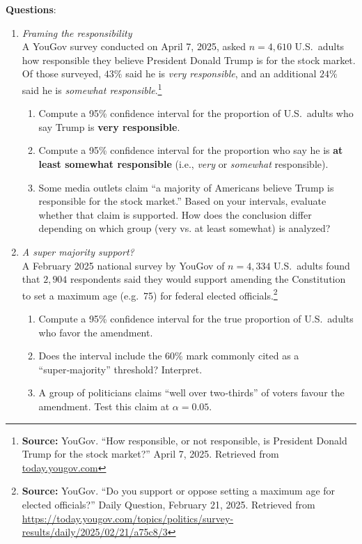 \documentclass{article}
\begin{document}
\textbf{Questions}:
\begin{enumerate}
\item  \emph{Framing the responsibility} \\
      A YouGov survey conducted on April 7, 2025, asked $n = 4{,}610$ U.S.\ adults how responsible they believe President Donald Trump is for the stock market. Of those surveyed, $43\%$ said he is \emph{very responsible}, and an additional $24\%$ said he is \emph{somewhat responsible}.\footnote{\textbf{Source:} YouGov. “How responsible, or not responsible, is President Donald Trump for the stock market?” April 7, 2025. Retrieved from \href{https://today.yougov.com/topics/politics/survey-results/daily/2025/04/07/6be5c/3}{today.yougov.com}}
      \begin{enumerate}[label=(\alph*)]
         \item Compute a 95\% confidence interval for the proportion of U.S.\ adults who say Trump is \textbf{very responsible}.
         \item Compute a 95\% confidence interval for the proportion who say he is \textbf{at least somewhat responsible} (i.e., \emph{very} or \emph{somewhat} responsible).
         \item Some media outlets claim “a majority of Americans believe Trump is responsible for the stock market.” Based on your intervals, evaluate whether that claim is supported. How does the conclusion differ depending on which group (very vs. at least somewhat) is analyzed?
      \end{enumerate}

\item \emph{A super majority support?} \\ A February 2025 national survey by YouGov of $n=4{,}334$ U.S.\ adults found that $2{,}904$ respondents
      said they would support amending the Constitution to set a maximum age (e.g.\ 75) for federal elected officials.\footnote{\textbf{Source:} YouGov. “Do you support or oppose setting a maximum age for elected officials?” Daily Question, February 21, 2025. Retrieved from \url{https://today.yougov.com/topics/politics/survey-results/daily/2025/02/21/a75c8/3}}
      \begin{enumerate}[label=(\alph*)]
         \item Compute a 95\% confidence interval for the true proportion of U.S.\ adults who favor the amendment.
         \item Does the interval include the 60\% mark commonly cited as a “super‑majority” threshold?  Interpret.
         \item A group of politicians claims “well over two‑thirds” of voters favour the amendment.  Test this claim at $\alpha=0.05$.
      \end{enumerate}


\end{enumerate}
\end{document}
